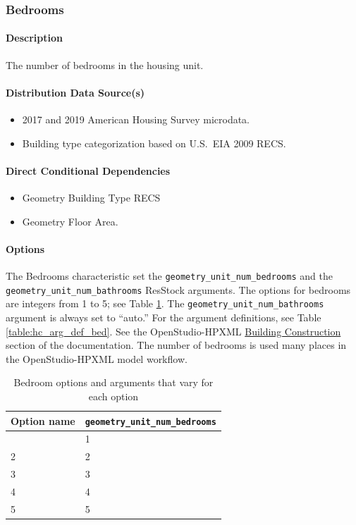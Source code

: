 \subsubsection{Bedrooms}

\paragraph{Description}
The number of bedrooms in the housing unit.

\paragraph{Distribution Data Source(s)}
\begin{itemize}
    \item 2017 and 2019 American Housing Survey microdata.
    \item Building type categorization based on U.S.~EIA 2009 RECS.
\end{itemize}

\paragraph{Direct Conditional Dependencies}
\begin{itemize}
    \item Geometry Building Type RECS
    \item Geometry Floor Area.
\end{itemize}

\paragraph{Options}
The Bedrooms characteristic set the \texttt{geometry\_unit\_num\_bedrooms} and the \texttt{geometry\_unit\_num\_bathrooms} ResStock arguments. The options for bedrooms are integers from 1 to 5; see Table \ref{table:hc_opt_bed}. The \texttt{geometry\_unit\_num\_bathrooms} argument is always set to ``auto.'' For the argument definitions, see Table \ref{table:hc_arg_def_bed}. See the OpenStudio-HPXML \href{https://openstudio-hpxml.readthedocs.io/en/v1.8.1/workflow_inputs.html#hpxml-building-construction}{Building Construction} section of the documentation. The number of bedrooms is used many places in the OpenStudio-HPXML model workflow.

\begin{longtable}[]{ |p{}|p{4cm}| }
\caption{Bedroom options and arguments that vary for each option} \label{table:hc_opt_bed} \\
\toprule\noalign{}
Option name & \texttt{geometry\_unit\_num\_bedrooms} \\
\midrule\noalign{}
\endhead
\bottomrule\noalign{}
\endlastfoot
1 & 1 \\
\hline
2 & 2 \\
\hline
3 & 3 \\
\hline
4 & 4 \\
\hline
5 & 5 \\
\end{longtable}

